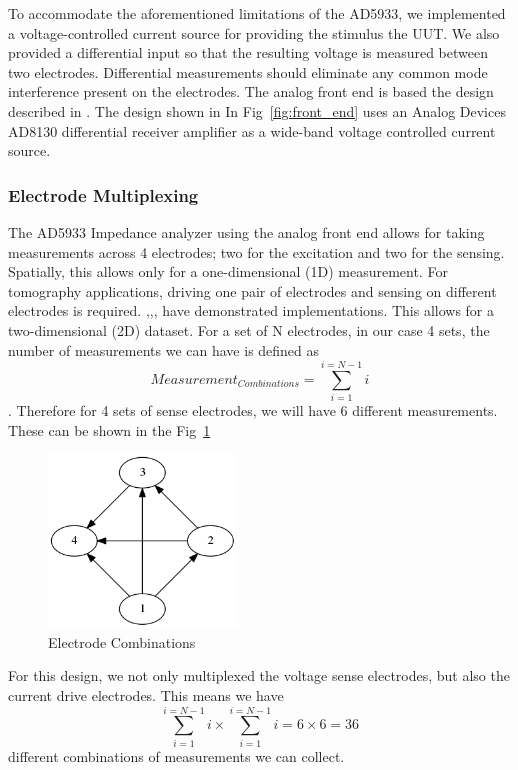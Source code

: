 \documentclass[]{IEEEtran}
\begin{document}
To accommodate the aforementioned limitations of the AD5933, we implemented a voltage-controlled current source for providing the stimulus the UUT. We also provided a differential input so that the resulting voltage is measured between two electrodes. Differential measurements should eliminate any common mode interference present on the electrodes. The analog front end is based the design described in \cite{harder_smart_2016}. The design shown in In Fig~\ref{fig:front_end} uses an Analog Devices AD8130 differential receiver amplifier\cite{noauthor_ad8130_nodate} as a wide-band voltage controlled current source.

\subsubsection{Electrode Multiplexing}
The AD5933 Impedance analyzer using the analog front end allows for taking measurements across 4 electrodes; two for the excitation and two for the sensing. Spatially, this allows only for a one-dimensional (1D) measurement. For tomography applications, driving one pair of electrodes and sensing on different electrodes is required. \cite{hua_using_1993},\cite{dimas_development_2017},\cite{wang_electrical_nodate}, \cite{vilchez-monge_image_2017} have demonstrated implementations. This allows for a two-dimensional (2D) dataset. For a set of N electrodes, in our case 4 sets, the number of measurements we can have is defined as \[Measurement_{Combinations}=\sum_{i=1}^{i=N-1}i\]. Therefore for 4 sets of sense electrodes, we will have 6 different measurements. These can be shown in the Fig~\ref{fig:combo4}

\begin{figure} %
\centering
\includegraphics[width=5cm ]{./graphics/combo4.png}
\centering
\caption{Electrode Combinations}
\label{fig:combo4}
\end{figure}

For this design, we not only multiplexed the voltage sense electrodes, but also the current drive electrodes. This means we have \[\sum_{i=1}^{i=N-1}i\times\sum_{i=1}^{i=N-1}i=6\times6=36\]
different combinations of measurements we can collect.
\end{document}
